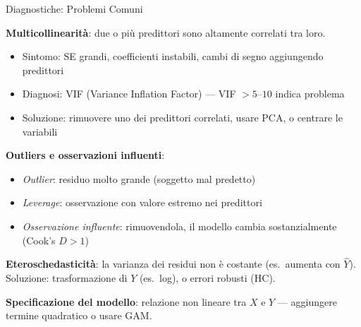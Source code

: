 \documentclass[
  ignorenonframetext,
]{beamer}
\begin{document}
\begin{frame}{Diagnostiche: Problemi Comuni}
\label{diagnostiche-problemi-comuni}
\small

\textbf{Multicollinearità}: due o più predittori sono altamente
correlati tra loro.

\begin{itemize}\footnotesize
\item Sintomo: SE grandi, coefficienti instabili, cambi di segno aggiungendo predittori
\item Diagnosi: VIF (Variance Inflation Factor) --- VIF $> 5$--$10$ indica problema
\item Soluzione: rimuovere uno dei predittori correlati, usare PCA, o centrare le variabili
\end{itemize}

\vspace{0.3em}

\textbf{Outliers e osservazioni influenti}:

\begin{itemize}\footnotesize
\item \emph{Outlier}: residuo molto grande (soggetto mal predetto)
\item \emph{Leverage}: osservazione con valore estremo nei predittori
\item \emph{Osservazione influente}: rimuovendola, il modello cambia sostanzialmente (Cook's $D > 1$)
\end{itemize}

\vspace{0.3em}

\textbf{Eteroschedasticità}: la varianza dei residui non è costante
(es.~aumenta con \(\hat{Y}\)). Soluzione: trasformazione di \(Y\)
(es.~log), o errori robusti (HC).

\vspace{0.3em}

\textbf{Specificazione del modello}: relazione non lineare tra \(X\) e
\(Y\) --- aggiungere termine quadratico o usare GAM.
\end{frame}
\end{document}
